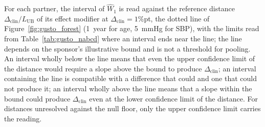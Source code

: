 \documentclass[AMA,Times1COL]{WileyNJDv5}
\begin{document}
For each partner, the interval of $\widehat{W}_1$ is read against the reference distance $\Delta_{\text{clin}} / L_{\text{UB}}$ of its effect modifier at $\Delta_{\text{clin}} = 1$\%pt, the dotted line of Figure~\ref{fig:gusto_forest} (1~year for age, 5~mmHg for SBP), with the limits read from Table~\ref{tab:gusto_nabcd} where an interval ends near the line; the line depends on the sponsor's illustrative bound and is not a threshold for pooling. An interval wholly below the line means that even the upper confidence limit of the distance would require a slope above the bound to produce $\Delta_{\text{clin}}$; an interval containing the line is compatible with a difference that could and one that could not produce it; an interval wholly above the line means that a slope within the bound could produce $\Delta_{\text{clin}}$ even at the lower confidence limit of the distance. For distances unresolved against the null floor, only the upper confidence limit carries the reading.
\end{document}
